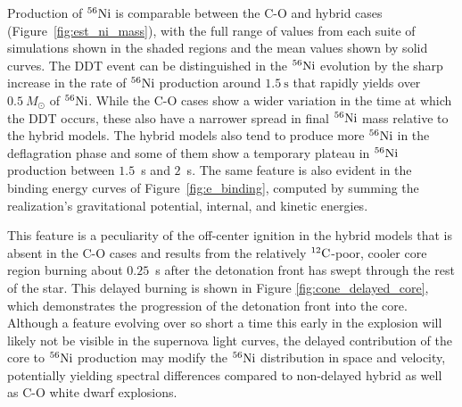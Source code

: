 \documentclass[iop,apj]{emulateapj}
\newcommand{\figref}[1]{Figure~\ref{#1}}
\newcommand{\C}[1]{\ensuremath{{}^{#1}{\rm C}}}
\newcommand{\Ni}[1]{\ensuremath{{}^{#1}{\rm Ni}}}
\newcommand{\unitstyle}[1]{\ensuremath{\mathrm{#1}}}
\newcommand{\second}{\unitstyle{s}}
\newcommand{\Msun}{\ensuremath{M_\odot}}
\begin{document}
Production of \Ni{56} is comparable between the C-O and hybrid cases
(\figref{fig:est_ni_mass}), with the full range of values from each
suite of simulations shown in the shaded regions and the mean values
shown by solid curves. The DDT event can be distinguished in the
\Ni{56} evolution by the sharp increase in the rate of \Ni{56}
production around $1.5~\second$ that rapidly yields over $0.5~\Msun$ of
\Ni{56}. While the C-O cases show a wider variation in the time at
which the DDT occurs, these also have a narrower spread in final
\Ni{56} mass relative to the hybrid models. The hybrid models also
tend to produce more \Ni{56} in the deflagration phase and some of
them show a temporary plateau in \Ni{56} production between $1.5$~s
and $2$~s. The same feature is also evident in the binding energy
curves of \figref{fig:e_binding}, computed by summing the
realization's gravitational potential, internal, and kinetic energies.

This feature is a peculiarity of the off-center ignition in the hybrid models that is 
absent in the C-O cases and results from the relatively \C{12}-poor,
cooler core region burning about $0.25$~s after the detonation front has
swept through the rest of the star. This delayed burning is shown in
Figure \ref{fig:cone_delayed_core}, which demonstrates the progression of
the detonation front into the core. Although a feature evolving over so
short a time this early in the explosion will likely not be visible in
the supernova light curves, the delayed contribution
of the core to \Ni{56} production may modify the \Ni{56} distribution in
space and velocity, potentially yielding spectral differences compared to non-delayed
hybrid as well as C-O white dwarf explosions.
\end{document}
